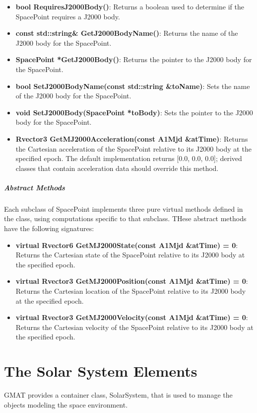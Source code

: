 \begin{itemize}
\item \textbf{bool RequiresJ2000Body()}: Returns a boolean used to determine if the SpacePoint
requires a J2000 body.
\item \textbf{const std::string\& GetJ2000BodyName()}: Returns the name of the J2000 body for the
SpacePoint.
\item \textbf{SpacePoint *GetJ2000Body()}: Returns the pointer to the J2000 body for the
SpacePoint.
\item \textbf{bool SetJ2000BodyName(const std::string \&toName)}: Sets the name of the J2000 body
for the SpacePoint.
\item \textbf{void SetJ2000Body(SpacePoint *toBody)}: Sets the pointer to the J2000 body for the
SpacePoint.
\item \textbf{Rvector3 GetMJ2000Acceleration(const A1Mjd \&atTime)}: Returns the Cartesian
acceleration of the SpacePoint relative to its J2000 body at the specified epoch.  The default
implementation returns [0.0, 0.0, 0.0]; derived classes that contain acceleration data should
override this method.
\end{itemize}

\subparagraph{\textit{Abstract Methods}}

Each subclass of SpacePoint implements three pure virtual methods defined in the class, using
computations specific to that subclass.  THese abstract methods have the following signatures:

\begin{itemize}
\item \textbf{virtual Rvector6 GetMJ2000State(const A1Mjd \&atTime) = 0}: Returns the Cartesian
state of the SpacePoint relative to its J2000 body at the specified epoch.
\item \textbf{virtual Rvector3 GetMJ2000Position(const A1Mjd \&atTime) = 0}: Returns the Cartesian
location of the SpacePoint relative to its J2000 body at the specified epoch.
\item \textbf{virtual Rvector3 GetMJ2000Velocity(const A1Mjd \&atTime) = 0}: Returns the Cartesian
velocity of the SpacePoint relative to its J2000 body at the specified epoch.
\end{itemize}

\section{The Solar System Elements}

GMAT provides a container class, SolarSystem, that is used to manage the objects modeling the space
environment.

